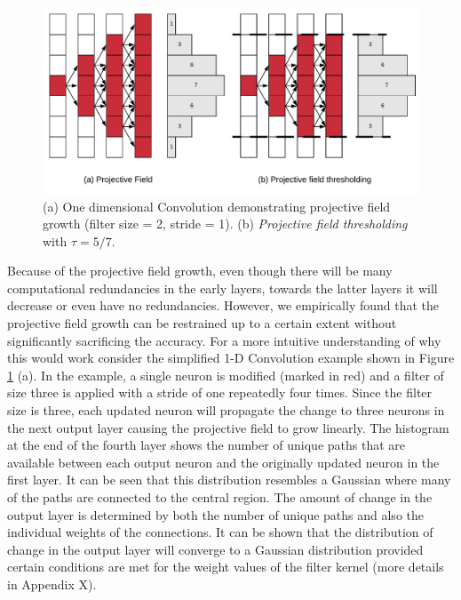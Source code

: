 \begin{figure}[t]
\includegraphics[width=\columnwidth]{images/pf_truncate}
\caption{(a) One dimensional Convolution demonstrating projective field growth (filter size = 2, stride = 1). (b) \textit{Projective field thresholding} with $\tau = 5/7$.}
\label{fig:pf_truncate}
\end{figure}

Because of the projective field growth, even though there will be many computational redundancies in the early layers, towards the latter layers it will decrease or even have no redundancies.
However, we empirically found that the projective field growth can be restrained up to a certain extent without significantly sacrificing the accuracy.
For a more intuitive understanding of why this would work consider the simplified 1-D Convolution example shown in Figure \ref{fig:pf_truncate} (a).
In the example, a single neuron is modified (marked in red) and a filter of size three is applied with a stride of one repeatedly four times.
Since the filter size is three, each updated neuron will propagate the change to three neurons in the next output layer causing the projective field to grow linearly.
The histogram at the end of the fourth layer shows the number of unique paths that are available between each output neuron and the originally updated neuron in the first layer.
It can be seen that this distribution resembles a Gaussian where many of the paths are connected to the central region.
The amount of change in the output layer is determined by both the number of unique paths and also the individual weights of the connections.
It can be shown that the distribution of change in the output layer will converge to a Gaussian distribution provided certain conditions are met for the weight values of the filter kernel (more details in Appendix X).

